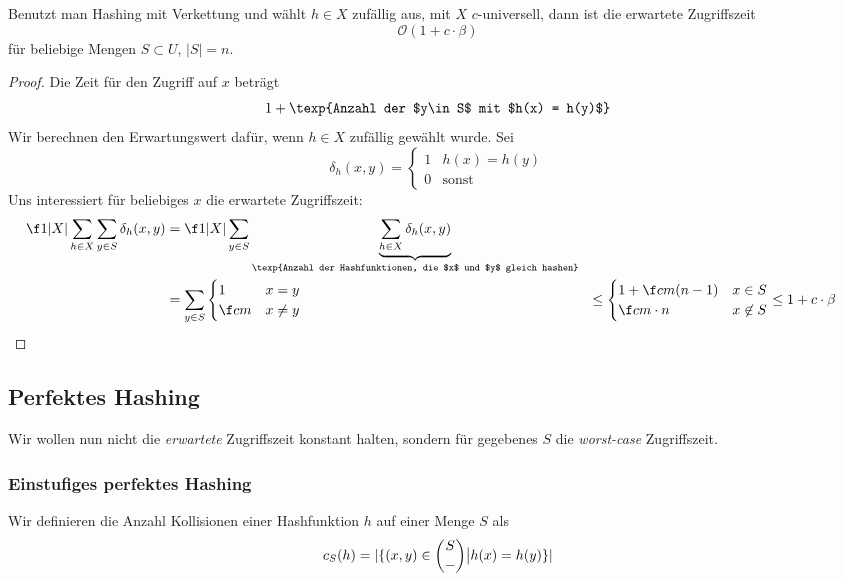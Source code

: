 \documentclass[11pt]{scrartcl}
\renewcommand{\O}{\mathcal{O}}
\begin{document}
\begin{st}
	Benutzt man Hashing mit Verkettung und wählt $h\in X$ zufällig aus, mit $X$ $c$-universell,
	dann ist die erwartete Zugriffszeit
	\[
		\O(1+c\cdot \beta)
	\]
	für beliebige Mengen $S\subset U$, $|S|=n$.
	\begin{proof}
		Die Zeit für den Zugriff auf $x$ beträgt
		\[
			1 + \texp{Anzahl der $y\in S$ mit $h(x) = h(y)$}
		\]
		Wir berechnen den Erwartungswert dafür, wenn $h\in X$ zufällig gewählt wurde.
		Sei
		\[
			\delta_h  (x,y) = \begin{cases}1 & h(x) = h(y)\\ 0& \text{sonst}\end{cases}
		\]
		Uns interessiert für beliebiges $x$ die erwartete Zugriffszeit:
		\begin{align*}
			\f 1{|X|}\sum_{h\in X} \sum_{y\in S} \delta_h(x,y) &= 
			\f 1{|X|}\sum_{y\in S} \underbrace{\sum_{h\in X} \delta_h(x,y)}_{\texp{Anzahl der Hashfunktionen, die $x$ und $y$ gleich hashen}} \\
			&= \sum_{y\in S} \begin{cases} 1 & x=y \\ \f cm & x\neq y\end{cases}
			&\le  \begin{cases} 1 + \f cm (n-1) & x\in S\\ \f cm\cdot n & x\not \in S\end{cases}
			&\le 1 + c\cdot \beta
		\end{align*}
	\end{proof}
\end{st}


\subsection{Perfektes Hashing}

Wir wollen nun nicht die \emph{erwartete} Zugriffszeit konstant halten, sondern für gegebenes $S$ die \emph{worst-case} Zugriffszeit.

\subsubsection{Einstufiges perfektes Hashing}

\begin{df}
	Wir definieren die Anzahl Kollisionen einer Hashfunktion $h$ auf einer Menge $S$ als
	\[
		c_S(h) = |\{(x,y) \in \binom{S}{\--} \big| h(x)=h(y)\}|
	\]
\end{df}
\end{document}
